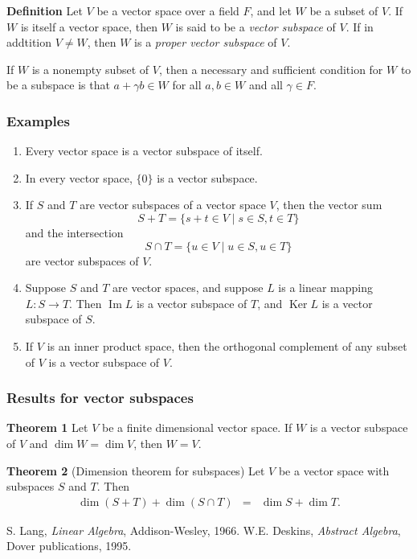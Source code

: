 \documentclass[12pt]{article}
\begin{document}
{\bf Definition} 
Let $V$ be a vector space over a field $F$, 
and let $W$ be a subset of $V$.
If $W$ is itself a vector space,
then $W$ is said to be a \emph{vector subspace} of $V$.
If in addtition $V\neq W$, then $W$ is a \emph{proper vector subspace} of $V$. 

If $W$ is a nonempty subset of $V$,
then a necessary and sufficient condition for $W$ to be a subspace
is that $a+\gamma b \in W$ 
for all $a,b \in W$ and all $\gamma \in F$.

\subsubsection{Examples}
\begin{enumerate}
\item Every vector space is a vector subspace of itself.
\item In every vector space, $\{0\}$ is a vector subspace.
\item If $S$ and $T$ are vector subspaces of a vector space $V$, 
then the vector sum 
\[
  S+T=\{s+t \in V \mid s\in S, t\in T\}
\]
and the intersection 
\[
  S\cap T = \{u \in V \mid u\in S, u\in T \}
\]
are vector subspaces of $V$.
\item Suppose $S$ and $T$ are vector spaces,
and suppose $L$ is a linear
mapping $L\colon S\to T$.
Then $\operatorname{Im}L$ is a vector subspace of $T$,
and $\operatorname{Ker}L$ is a vector subspace of $S$.
\item If $V$ is an inner product space,
then the orthogonal complement of any subset of $V$
is a vector subspace of $V$.
\end{enumerate}

\subsubsection{Results for vector subspaces}

{\bf Theorem 1} \cite{lang}
 Let $V$ be a finite dimensional vector space.
 If $W$ is a vector subspace of $V$ and $\dim W=\dim V$, then $W=V$.
 
 {\bf Theorem 2} \cite{deskins} (Dimension theorem for subspaces)
 Let $V$ be a vector space with
 subspaces $S$ and $T$. Then
 \begin{eqnarray*}
 \dim (S+T) + \dim (S\cap T) &=& \dim S + \dim T.
 \end{eqnarray*}
 
 \begin{thebibliography}{9}
  S. Lang,
 \emph{Linear Algebra},
 Addison-Wesley, 1966.
  W.E. Deskins,
 \emph{Abstract Algebra},
 Dover publications,
 1995.
 \end{thebibliography}
\end{document}
